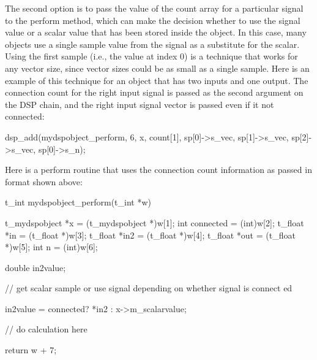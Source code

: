 The second option is to pass the value of the count array for a particular signal to the perform method, which can make the decision whether to use the signal value or a scalar value that has been stored inside the object. In this case, many objects use a single sample value from the signal as a substitute for the scalar. Using the first sample (i.e., the value at index 0) is a technique that works for any vector size, since vector sizes could be as small as a single sample. Here is an example of this technique for an object that has two inputs and one output. The connection count for the right input signal is passed as the second argument on the DSP chain, and the right input signal vector is passed even if it not connected:


\begin{DoxyCode}
        dsp_add(mydspobject_perform, 6, x, count[1], sp[0]->s_vec, sp[1]->s_vec, 
      sp[2]->s_vec, sp[0]->s_n);
\end{DoxyCode}


Here is a perform routine that uses the connection count information as passed in format shown above:


\begin{DoxyCode}
    t_int mydspobject_perform(t_int *w)
    {
        t_mydspobject *x = (t_mydspobject *)w[1];
        int connected = (int)w[2];
        t_float *in = (t_float *)w[3];
        t_float *in2 = (t_float *)w[4];
        t_float *out = (t_float *)w[5];
        int n = (int)w[6];

        double in2value;

        // get scalar sample or use signal depending on whether signal is connect
      ed

        in2value = connected? *in2 : x->m_scalarvalue;

        // do calculation here

        return w + 7;
    }
\end{DoxyCode}
 